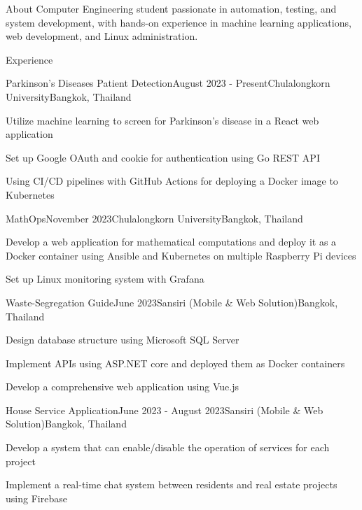 \documentclass[12pt]{resume}
\begin{document}
\begin{rSection}{About}
    Computer Engineering student passionate in automation, testing, and system development, with hands-on experience in machine learning applications, web development, and Linux administration.
\end{rSection}

\begin{rSection}{Experience}

	\begin{rSubsection}{Parkinson's Diseases Patient Detection}{August 2023 - Present}{Chulalongkorn University}{Bangkok, Thailand}
        \item Utilize machine learning to screen for Parkinson's disease in a React web application
        \item Set up Google OAuth and cookie for authentication using Go REST API
        \item Using CI/CD pipelines with GitHub Actions for deploying a Docker image to Kubernetes
	\end{rSubsection}

	\begin{rSubsection}{MathOps}{November 2023}{Chulalongkorn University}{Bangkok, Thailand}
        \item Develop a web application for mathematical computations and deploy it as a Docker container using Ansible and Kubernetes on multiple Raspberry Pi devices
        \item Set up Linux monitoring system with Grafana
	\end{rSubsection}

	\begin{rSubsection}{Waste-Segregation Guide}{June 2023}{Sansiri (Mobile \& Web Solution)}{Bangkok, Thailand}
        \item Design database structure using Microsoft SQL Server
        \item Implement APIs using ASP.NET core and deployed them as Docker containers
        \item Develop a comprehensive web application using Vue.js
	\end{rSubsection}

    \begin{rSubsection}{House Service Application}{June 2023 - August 2023}{Sansiri (Mobile \& Web Solution)}{Bangkok, Thailand}
        \item Develop a system that can enable/disable the operation of services for each project
        \item Implement a real-time chat system between residents and real estate projects using Firebase
    \end{rSubsection}

\end{rSection}
\end{document}
